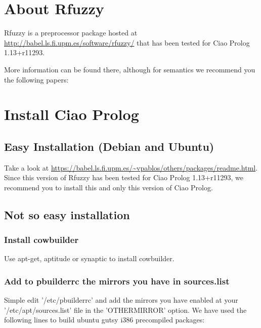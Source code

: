 

\newcommand{\baseuri}[0]{https://babel.ls.fi.upm.es/~vpablos/others/packages}
\newcommand{\ciaoversion}[0]{1.13+r11293}

\section{About Rfuzzy}

Rfuzzy is a preprocessor package hosted at
\url{http://babel.ls.fi.upm.es/software/rfuzzy/}
that has been tested for Ciao Prolog \ciaoversion.

More information can be found there, although for semantics we recommend
you the following papers:
%
\cite{MunozHernandez2010}
\cite{jisbd:2010:vpcafdsmh}
\cite{hardandsoft:2010:afdvpcsmh}
\cite{DBLP:conf/eusflat/StrassMC09}
\cite{DBLP:conf/iwann/Munoz-HernandezCS09}
\cite{5156427}
\cite{victor:susana:2008:wlpe}

\section{Install Ciao Prolog}
\subsection{Easy Installation (Debian and Ubuntu)}

Take a look at 
\url{\baseuri /readme.html}. 
Since this version of Rfuzzy has been tested for Ciao Prolog \ciaoversion,
we recommend you to install this and only this version of Ciao Prolog.

\subsection{Not so easy installation}

\subsubsection{Install cowbuilder}
Use apt-get, aptitude or synaptic to install cowbuilder.
\subsubsection{Add to pbuilderrc the mirrors you have in sources.list}
Simple edit '/etc/pbuilderrc' and add the mirrors
you have enabled at your '/etc/apt/sources.list' file in the 'OTHERMIRROR' option. 
We have used the following lines to build ubuntu gutsy i386 precompiled packages:

